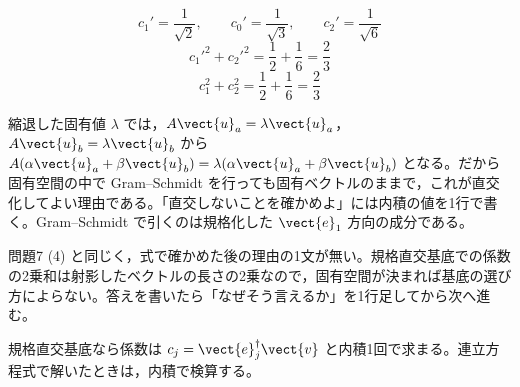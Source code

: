 \[ c_{1}'=\frac{1}{\sqrt{2}},\qquad c_{0}'=\frac{1}{\sqrt{3}},\qquad c_{2}'=\frac{1}{\sqrt{6}} \]
\[ c_{1}'^{2}+c_{2}'^{2}=\frac{1}{2}+\frac{1}{6}=\frac{2}{3} \]
\[ c_{1}^{2}+c_{2}^{2}=\frac{1}{2}+\frac{1}{6}=\frac{2}{3} \]
\item 縮退した固有値 $\lambda$ では，$A\vect{u}_{a}=\lambda\vect{u}_{a}$，$A\vect{u}_{b}=\lambda\vect{u}_{b}$ から $A(\alpha\vect{u}_{a}+\beta\vect{u}_{b})=\lambda(\alpha\vect{u}_{a}+\beta\vect{u}_{b})$ となる。だから固有空間の中で Gram--Schmidt を行っても固有ベクトルのままで，これが直交化してよい理由である。「直交しないことを確かめよ」には内積の値を1行で書く。Gram--Schmidt で引くのは規格化した $\vect{e}_{1}$ 方向の成分である。
\item {} 問題7 (4) と同じく，式で確かめた後の理由の1文が無い。規格直交基底での係数の2乗和は射影したベクトルの長さの2乗なので，固有空間が決まれば基底の選び方によらない。答えを書いたら「なぜそう言えるか」を1行足してから次へ進む。
\item 規格直交基底なら係数は $c_{j}=\vect{e}_{j}^{\dagger}\vect{v}$ と内積1回で求まる。連立方程式で解いたときは，内積で検算する。
